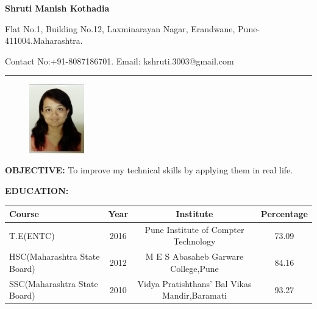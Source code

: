 \documentclass[]{article}
\begin{document}
\begin{center}
	{
	
	\Large{\textbf{Shruti Manish Kothadia}}\\
	}
\end{center}

\begin{center}
\vspace{+0.1in}
Flat No.1, Building No.12, Laxminarayan Nagar, Erandwane, Pune-411004.Maharashtra.
\end{center}
\begin{flushleft}
\vspace{-0.1in}
Contact No:+91-8087186701.\hspace{2.7 in} Email: kshruti.3003@gmail.com
\end{flushleft}
\vspace{-0.2in}
\noindent\rule{16.5cm}{0.4pt}


\begin{flushright}
\begin{figure}[h]
\hspace{5.1in}
\includegraphics[width=90px]{shruti}

\end{figure}
\end{flushright}
\begin{flushleft}
\vspace{-0.4in}
 	\textbf{\large OBJECTIVE:}
 	\hspace{0.02in}
 	To improve my technical skills by applying them in real life.
  \end{flushleft}
 \begin{flushleft}
 \vspace{0.15in}
  	\textbf{\large EDUCATION:}
 	
 \vspace{0.15in}
 	\begin{tabular}{||l|c|c|c||}
 	\hline 
 	Course & Year & Institute & Percentage \\ 
 	\hline 
 	T.E(ENTC) & 2016 & Pune Institute of Compter Technology & 73.09 \\ 
 	\hline 
 	HSC(Maharashtra State Board) & 2012 & M E S Abasaheb Garware College,Pune & 84.16 \\ 
 	\hline 
 	SSC(Maharashtra State Board) & 2010 & Vidya Pratishthans' Bal Vikas Mandir,Baramati & 93.27 \\ 
 	\hline 
 	\end{tabular} 
 \end{flushleft}
 
\end{document}
